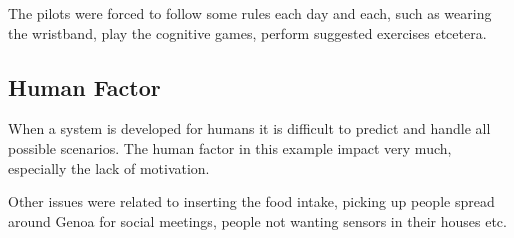 The pilots were forced to follow some rules each day and each, such as wearing the wristband, play the cognitive games, perform suggested exercises etcetera.

\subsection{Human Factor}
When a system is developed for humans it is difficult to predict and handle all possible scenarios.
The human factor in this example impact very much, especially the lack of motivation. 

Other issues were related to inserting the food intake, picking up people spread around Genoa for social meetings, people not wanting sensors in their houses etc.